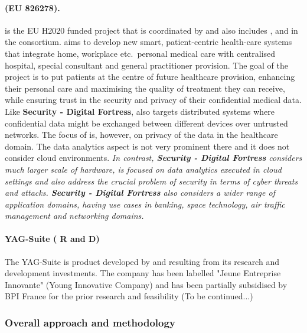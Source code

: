 \documentclass[a4paper,11pt]{article}
\newcommand{\project}[1]{\textbf{#1}\xspace}
\newcommand{\SECURITY}{\project{Security - Digital Fortress}}
\newcommand{\TheProject}{\SECURITY}
\begin{document}
\begin{mdframed}[backgroundcolor=blue!5]
\paragraph{\serums (EU 826278).} \serums is the EU H2020 funded project that is coordinated by \USTANshort{} and also includes \SOPRAshort{}, \IBMshort{} and \SCCHshort{} in the consortium. \serums aims to develop new smart, patient-centric health-care systems that integrate home, workplace etc.~personal medical care with centralised hospital, special consultant and general practitioner provision. The goal of the \serums project is to put patients at the centre of future healthcare provision, enhancing their personal care and maximising the quality of treatment they can receive, while ensuring trust in the security and privacy of their confidential medical data. Like \TheProject{}, \serums also targets distributed systems where confidential data might be exchanged between different devices over untrusted networks. The focus of \serums is, however, on privacy of the data in the healthcare domain. The data analytics aspect is not very prominent there and it does not consider cloud environments. \emph{In contrast, \TheProject{} considers much larger scale of hardware, is focused on data analytics executed in cloud settings and also address the crucial problem of security in terms of cyber threats and attacks. \TheProject{} also considers a wider range of application domains, having use cases in banking, space technology, air traffic management and networking domains.}
\end{mdframed}


\begin{mdframed}[backgroundcolor=blue!5]
\paragraph{YAG-Suite (\YAGshort{} R and D) } The YAG-Suite is product developed by \YAGshort{} and resulting from its research and development investments. The company has been labelled "Jeune Entreprise Innovante" (Young Innovative Company) and has been partially subsidised by BPI France for the prior research and feasibility (To be continued...)
\end{mdframed}

\subsubsection{Overall approach and methodology}
\end{document}
